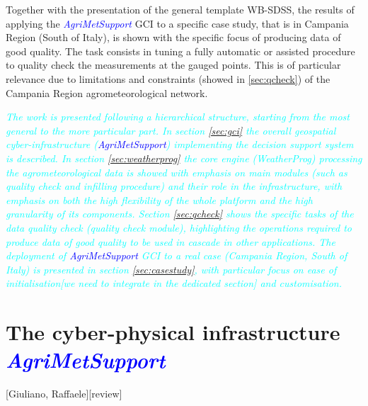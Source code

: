 \documentclass[authoryear,preprint,review,12pt]{elsarticle}
\newcommand{\update}[1]{\emph{\textcolor{blue}{#1}}}
\newcommand{\review}[1]{\emph{\textcolor{cyan}{#1}}}
\newcommand{\gci}{\update{AgriMetSupport}\xspace}
\begin{document}
Together with the presentation of the general template WB-SDSS, the results of applying the \gci GCI to a specific case study, that is in Campania Region (South of Italy), is shown with the specific focus of producing data of good quality.
The task consists in tuning a fully automatic or assisted procedure to quality check the measurements at the gauged points.
This is of particular relevance due to limitations and constraints (showed in \cref{sec:qcheck}) of the Campania Region agrometeorological network.

\review{The work is presented following a hierarchical structure, starting from the most general to the more particular part.
In section \ref{sec:gci} the overall geospatial cyber-infrastructure (\gci) implementing the decision support system is described.
In section \ref{sec:weatherprog} the core engine (WeatherProg) processing the agrometeorological data is showed with emphasis on main modules (such as quality check and infilling procedure) and their role in the infrastructure, with emphasis on both the high flexibility of the whole platform and the high granularity of its components.
Section \ref{sec:qcheck} shows the specific tasks of the data quality check (quality check module), highlighting the operations required to produce data of good quality to be used in cascade in other 
applications.
The deployment of \gci GCI to a real case (Campania Region, South of Italy) is presented in section \ref{sec:casestudy},  with particular focus on ease of \review{initialisation[we need to integrate in the dedicated section]} and customisation. }

\section{The cyber-physical infrastructure \gci}[Giuliano, Raffaele][review] \label{sec:gci}
\end{document}
